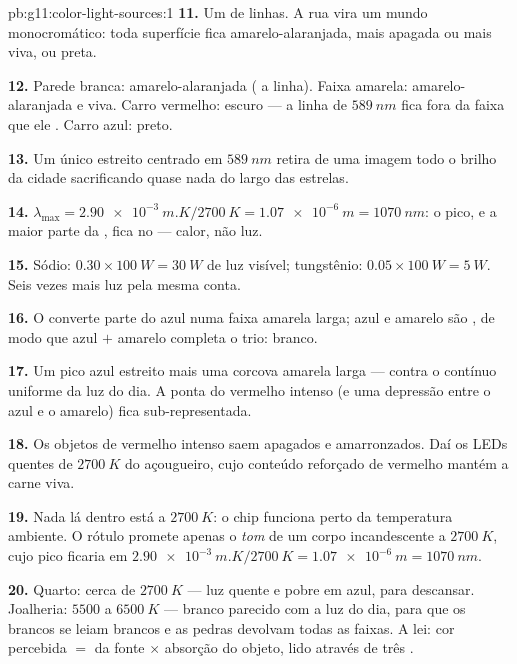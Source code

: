 \begin{solution}{pb:g11:color-light-sources:1}
\textbf{11.} Um  de linhas. A rua vira um mundo
monocromático: toda superfície fica amarelo-alaranjada, mais apagada ou
mais viva, ou preta.

\textbf{12.} Parede branca: amarelo-alaranjada ( a linha). Faixa
amarela: amarelo-alaranjada e viva. Carro vermelho: escuro --- a linha de
$\qty{589}{nm}$ fica fora da faixa que ele . Carro azul: preto.

\textbf{13.} Um único  estreito centrado em $\qty{589}{nm}$ retira
de uma imagem todo o brilho da cidade sacrificando quase nada do 
largo das estrelas.

\textbf{14.} $\lambda_{\max} = \qty{2.90e-3}{m.K}/\qty{2700}{K} =
\qty{1.07e-6}{m} = \qty{1070}{nm}$: o pico, e a maior parte da ,
fica no  --- calor, não luz.

\textbf{15.} Sódio: $0.30 \times \qty{100}{W} = \qty{30}{W}$ de luz
visível; tungstênio: $0.05 \times \qty{100}{W} = \qty{5}{W}$. Seis vezes
mais luz pela mesma conta.

\textbf{16.} O  converte parte do azul numa faixa amarela larga;
azul e amarelo são , de modo que azul $+$ amarelo completa
o trio: branco.

\textbf{17.} Um pico azul estreito mais uma corcova amarela larga ---
contra o contínuo uniforme da luz do dia. A ponta do vermelho intenso (e
uma depressão entre o azul e o amarelo) fica sub-representada.

\textbf{18.} Os objetos de vermelho intenso saem apagados e
amarronzados. Daí os LEDs quentes de $\qty{2700}{K}$ do açougueiro, cujo
conteúdo reforçado de vermelho mantém a carne viva.

\textbf{19.} Nada lá dentro está a $\qty{2700}{K}$: o chip funciona perto
da temperatura ambiente. O rótulo promete apenas o \emph{tom} de um corpo
incandescente a $\qty{2700}{K}$, cujo pico ficaria em
$\qty{2.90e-3}{m.K}/\qty{2700}{K} = \qty{1.07e-6}{m} = \qty{1070}{nm}$.

\textbf{20.} Quarto: cerca de $\qty{2700}{K}$ --- luz quente e pobre em
azul, para descansar. Joalheria: $5500$ a $\qty{6500}{K}$ --- branco
parecido com a luz do dia, para que os brancos se leiam brancos e as
pedras devolvam todas as faixas. A lei: cor percebida $=$  da
fonte $\times$ absorção do objeto, lido através de três .
\end{solution}
